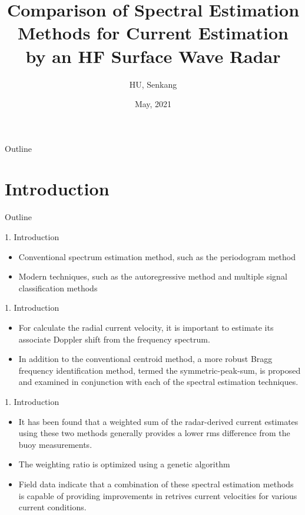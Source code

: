\documentclass[12pt]{beamer}
\title[]{Comparison of Spectral Estimation Methods for Current Estimation by an HF Surface Wave Radar}
\author[HU S.K.]{HU, Senkang}
\institute[BIT]{School of Information and Electronics\\ 
Beijing Institute of Technology\\
Beijing, China, 100081\\[1ex]
{\color{blue} \textit{\href{mailto:1120183150@bit.edu.cn}{1120183150@bit.edu.cn}}}\\

}
\date{May, 2021}
\begin{document}
\begin{frame}
  \titlepage
\end{frame}


\begin{frame}{Outline}
  \tableofcontents
\end{frame}

\section{Introduction}
\begin{frame}{Outline}
  \transfade%
  \tableofcontents[sectionstyle=show/shaded,subsectionstyle=show/shaded] %
\end{frame}


\begin{frame}{1. Introduction}
  \begin{itemize}
    \item {\color{magenta} Conventional spectrum estimation method}, such as the periodogram method
    \item {\color{magenta} Modern techniques}, such as the autoregressive method and multiple signal classification methods
    
  \end{itemize}
\end{frame}
\begin{frame}{1. Introduction}
  \begin{itemize}
    \item For calculate the radial current velocity, it is important to estimate its associate Doppler shift from { the frequency spectrum.}\pause
    \item In addition to the conventional centroid method, a more robust Bragg frequency identification method, termed the {\color{magenta} symmetric-peak-sum}, is proposed and examined in conjunction with each of the spectral estimation techniques. 
  \end{itemize}
\end{frame}
\begin{frame}{1. Introduction}
  \begin{itemize}
    \item It has been found that a weighted sum of the radar-derived current estimates using these two methods generally provides a lower rms difference from the buoy measurements. 
    \item The weighting ratio is optimized using a genetic algorithm
    \item Field data indicate that a combination of these spectral estimation methods is capable of providing improvements in retrives current velocities for various current conditions.
  \end{itemize}
\end{frame}
\end{document}
